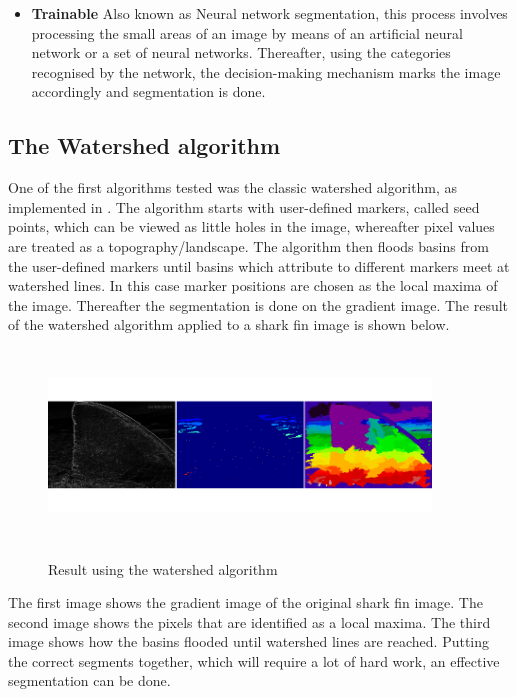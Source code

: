\documentclass[a4paper,10pt]{article}
\begin{document}
\begin{itemize}
 \item \textbf{Trainable} \cite{is} Also known as Neural network segmentation, this process involves processing the small areas of an image by means of an artificial neural network or a set of neural networks.  Thereafter, using the categories recognised by the network, the decision-making mechanism marks the image accordingly and segmentation is done.
\end{itemize}

\subsection{The Watershed algorithm}
One of the first algorithms tested was the classic watershed algorithm, as implemented in \cite{scikit}.  The algorithm starts with user-defined markers, called seed points, which can be viewed as little holes in the image, whereafter pixel values are treated as a topography/landscape.  The algorithm then floods basins from the user-defined markers until basins which attribute to different markers meet at watershed lines.  In this case marker positions are chosen as the local maxima of the image.  Thereafter the segmentation is done on the gradient image.  The result of the watershed algorithm applied to a shark fin image is shown below.

\begin{figure}[H]
\centering
\includegraphics[width=4in,height=2in]{watershed.png} 
\label{fig1}
\caption{Result using the watershed algorithm}
\end{figure}

\noindent The first image shows the gradient image of the original shark fin image.  The second image shows the pixels that are identified as a local maxima.  The third image shows how the basins flooded until watershed lines are reached.  Putting the correct segments together, which will require a lot of hard work, an effective segmentation can be done.
\end{document}
